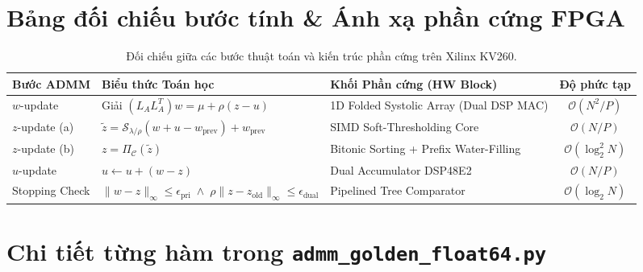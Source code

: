 \documentclass[12pt,a4paper]{article}
\begin{document}
\section{Bảng đối chiếu bước tính \& Ánh xạ phần cứng FPGA}

\begin{table}[htbp]
\centering
\small
\renewcommand{\arraystretch}{1.3}
\begin{tabularx}{\textwidth}{l p{5.2cm} X c}
\toprule
\textbf{Bước ADMM} & \textbf{Biểu thức Toán học} & \textbf{Khối Phần cứng (HW Block)} & \textbf{Độ phức tạp} \\
\midrule
$w$-update & Giải $(L_A L_A^T) w = \mu + \rho (z - u)$ & 1D Folded Systolic Array (Dual DSP MAC) & $\mathcal{O}(N^2 / P)$ \\
$z$-update (a) & $\tilde{z} = \mathcal{S}_{\lambda/\rho}(w + u - w_{\text{prev}}) + w_{\text{prev}}$ & SIMD Soft-Thresholding Core & $\mathcal{O}(N / P)$ \\
$z$-update (b) & $z = \Pi_{\mathcal{C}}(\tilde{z})$ & Bitonic Sorting + Prefix Water-Filling & $\mathcal{O}(\log_2^2 N)$ \\
$u$-update & $u \leftarrow u + (w - z)$ & Dual Accumulator DSP48E2 & $\mathcal{O}(N / P)$ \\
Stopping Check & $\|w - z\|_\infty \le \epsilon_{\text{pri}} \;\land\; \rho \|z - z_{\text{old}}\|_\infty \le \epsilon_{\text{dual}}$ & Pipelined Tree Comparator & $\mathcal{O}(\log_2 N)$ \\
\bottomrule
\end{tabularx}
\caption{Đối chiếu giữa các bước thuật toán và kiến trúc phần cứng trên Xilinx KV260.}
\end{table}

\section{Chi tiết từng hàm trong \texttt{admm\_golden\_float64.py}}
\end{document}
